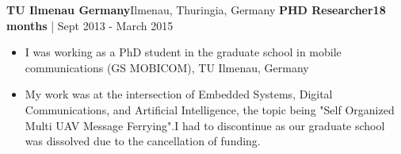 \vspace{12pt}
            
\textbf{TU Ilmenau Germany}\hfill{Ilmenau, Thuringia, Germany}
\newline
\textbf{PHD Researcher}\hfill{\textbf{18 months} | Sept 2013 - March 2015}
    
        \begin{itemize}
            \item {I was working as a PhD student in the graduate school in mobile communications (GS MOBICOM), TU Ilmenau, Germany}
            \item {My work was at the intersection of Embedded Systems, Digital Communications, and Artificial Intelligence, the topic being "Self Organized Multi UAV Message Ferrying".I had to discontinue as our graduate school was dissolved due to the cancellation of funding.}
        \end{itemize}

